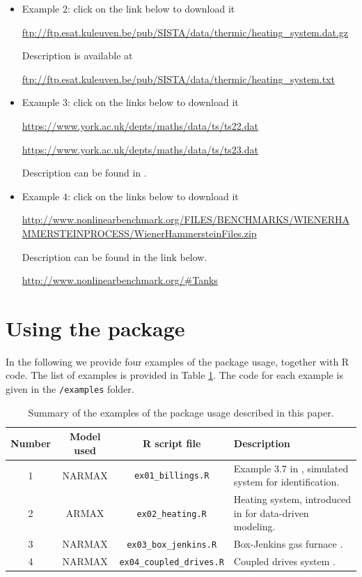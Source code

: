 \documentclass[preprint,12pt, a4paper]{elsarticle}
\begin{document}
\begin{itemize}
	\item Example 2: click on the link below to download it 
	
	\url{ftp://ftp.esat.kuleuven.be/pub/SISTA/data/thermic/heating_system.dat.gz}
	
	Description is available at 
	
	\url{ftp://ftp.esat.kuleuven.be/pub/SISTA/data/thermic/heating_system.txt}
	
	\item Example 3: click on the links below to download it 
	
	\url{https://www.york.ac.uk/depts/maths/data/ts/ts22.dat} 
	
	\url{https://www.york.ac.uk/depts/maths/data/ts/ts23.dat} 

	Description can be found in \cite{Box1970}. 
	
	\item Example 4: click on the links below to download it 	
	
	\url{http://www.nonlinearbenchmark.org/FILES/BENCHMARKS/WIENERHAMMERSTEINPROCESS/WienerHammersteinFiles.zip}
	
	Description can be found in the link below.
	
	\url{http://www.nonlinearbenchmark.org/#Tanks}
	
\end{itemize}




\section{Using the package}  \label{sec:examples}

In the following we provide four examples of the package usage, together with {R} code. The list of examples is provided in Table \ref{tab:ex}. The code for each example is given in the \verb|/examples| folder.

\begin{table}
	\begin{center}
		\begin{tabular}{cccp{5.5cm}}
			\hline 
			Number & Model used & {R} script file & Description \\
			\hline 
			1 & NARMAX & \verb|ex01_billings.R| & Example 3.7 in \cite{Billings2013}, simulated system for identification. \\
			\hline 
			2 & ARMAX  & \verb|ex02_heating.R| & Heating system, introduced in \cite{Dullerud1996} for data-driven modeling. \\
			\hline 
			3 & NARMAX & \verb|ex03_box_jenkins.R| & Box-Jenkins gas furnace \cite{Box1970}. \\
			\hline 
			4 & NARMAX & \verb|ex04_coupled_drives.R| & Coupled drives system \cite{Wigren2013}. \\
			\hline
		\end{tabular}
	\end{center}
	\caption{Summary of the examples of the package usage described in this paper.} \label{tab:ex}
\end{table}
\end{document}
